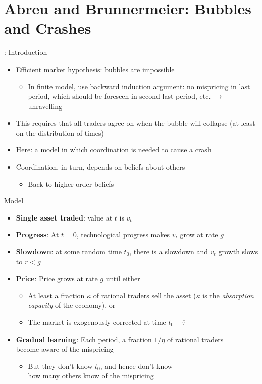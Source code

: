 \documentclass[english,10pt
,aspectratio=169
]{beamer}
\begin{document}
\section{Abreu and Brunnermeier: Bubbles and Crashes}

\begin{frame}{\cite{abreu_bubbles_2003}: Introduction}
	\begin{itemize}
		\item Efficient market hypothesis: bubbles are impossible
		\begin{itemize}
			\item In finite model, use backward induction argument: no mispricing in last period, which should be foreseen in second-last period, etc. $\rightarrow$ unravelling
		\end{itemize}
		\item This requires that all traders agree on when the bubble will collapse (at least on the distribution of times)
		\item Here: a model in which coordination is needed to cause a crash
		\item Coordination, in turn, depends on beliefs about others
		\begin{itemize}
			\item Back to higher order beliefs
		\end{itemize}
	\end{itemize}
\end{frame}


\begin{frame}{Model}
	\begin{itemize}
		\item \textbf{Single asset traded}: value at $t$ is $v_t$
		\item \textbf{Progress}: At $t=0$, technological progress  makes $v_t$ grow at rate $g$
		\item \textbf{Slowdown}: at some random time $t_0$, there is a slowdown and $v_t$ growth slows to $r<g$
		\item \textbf{Price}: Price grows at rate $g$ until either
		\begin{itemize}
			\item At least a fraction $\kappa$ of rational traders sell the asset ($\kappa$ is the \emph{absorption capacity} of the economy), or
			\item The market is exogenously corrected at time $t_0+\overline{\tau}$
		\end{itemize}
		\item \textbf{Gradual learning}: Each period, a fraction $1/\eta$ of rational traders 
		\\become aware of the mispricing
		\begin{itemize}
			\item But they don't know $t_0$, and hence don't know 
			\\how many others know of the mispricing
		\end{itemize}
	\end{itemize}
\end{frame}
\end{document}
